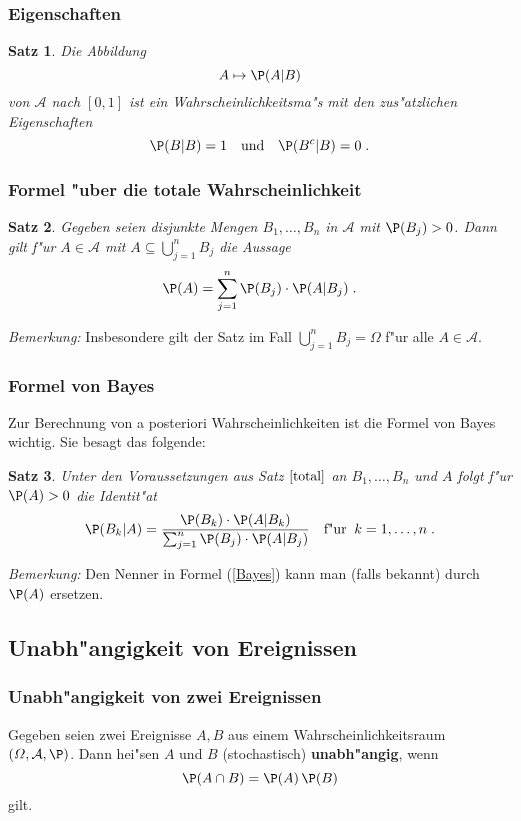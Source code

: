 \documentclass[ngerman,draft,parskip=half,twoside]{scrartcl}
\newtheorem{thm}{Satz}[section]
\newcommand*{\Algeb}{\mathcal{A}}   %
\begin{document}
\subsubsection{Eigenschaften}
\begin{thm}
Die Abbildung
$$
A\mapsto \P(A|B)
$$
von $\Algeb$ nach $[0,1]$ ist ein Wahrscheinlichkeitsma"s mit den zus"atzlichen Eigenschaften
$$
\P(B|B)=1\quad\mbox{und}\quad\P(B^c|B)=0\;.
$$
\end{thm}
\subsubsection{Formel "uber die totale Wahrscheinlichkeit}
\begin{thm}
\label{total}
Gegeben seien disjunkte Mengen $B_1,\ldots,B_n$ in $\Algeb$ mit
$\P(B_j)>0$. Dann gilt f"ur $A\in \Algeb$ mit $A\subseteq\bigcup_{j=1}^n B_j$
die Aussage
$$
\P(A)=\sum_{j=1}^n\P(B_j)\cdot\P(A|B_j)\;.
$$
\end{thm}
\textit{Bemerkung:} Insbesondere gilt der Satz im Fall $\bigcup_{j=1}^n B_j=\Omega$
f"ur alle $A\in\Algeb$.
\subsubsection{Formel von Bayes}
Zur Berechnung von a posteriori Wahrscheinlichkeiten ist die Formel von
Bayes wichtig. Sie besagt das folgende$\colon$
\begin{thm}
Unter den Voraussetzungen aus Satz $\ref{total}$ an $B_1,\ldots,B_n$ und $A$ folgt
f"ur
$\P(A)>0$ die Identit"at
\begin{equation}
\label{Bayes}
\P(B_k|A)=\frac{\P(B_k)\cdot\P(A|B_k)}{\sum_{j=1}^n
\P(B_j)\cdot\P(A|B_j)}\quad\mbox{f"ur}\;\;k=1,\ldots,n\;.
\end{equation}
\end{thm}
\textit{Bemerkung:} Den Nenner in Formel (\ref{Bayes}) kann man (falls bekannt) durch $\P(A)$
ersetzen.
\subsection{Unabh"angigkeit von Ereignissen}
\subsubsection{Unabh"angigkeit von zwei Ereignissen}
Gegeben seien zwei Ereignisse $A,B$ aus einem Wahrscheinlichkeitsraum $(\Omega,\Algeb,\P)$.
Dann hei"sen $A$ und $B$ (stochastisch) \textbf{unabh"angig}, wenn
$$
\P(A\cap B)=\P(A)\,\P(B)
$$
gilt.
\end{document}

